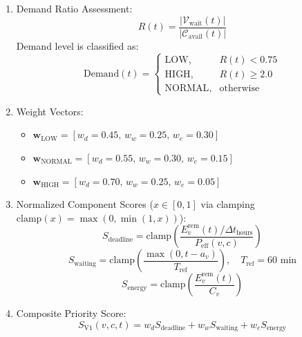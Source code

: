 \documentclass[conference]{IEEEtran}
\begin{document}
\begin{enumerate}
    \item Demand Ratio Assessment:
    \begin{equation}
    R(t) = \frac{|\mathcal{V}_{\mathrm{wait}}(t)|}{|\mathcal{C}_{\mathrm{avail}}(t)|}
    \end{equation}
    Demand level is classified as:
    \begin{equation}
    \mathrm{Demand}(t) = \begin{cases}
    \text{LOW}, & R(t) < 0.75 \\
    \text{HIGH}, & R(t) \ge 2.0 \\
    \text{NORMAL}, & \text{otherwise}
    \end{cases}
    \end{equation}
    \item Weight Vectors:
    \begin{itemize}
        \item $\mathbf{w}_{\mathrm{LOW}} = [w_d=0.45, \, w_w=0.25, \, w_e=0.30]$
        \item $\mathbf{w}_{\mathrm{NORMAL}} = [w_d=0.55, \, w_w=0.30, \, w_e=0.15]$
        \item $\mathbf{w}_{\mathrm{HIGH}} = [w_d=0.70, \, w_w=0.25, \, w_e=0.05]$
    \end{itemize}
    \item Normalized Component Scores ($x \in [0, 1]$ via clamping $\mathrm{clamp}(x) = \max(0, \min(1, x))$):
    \begin{equation}
    S_{\mathrm{deadline}} = \mathrm{clamp}\left( \frac{E_v^{\mathrm{rem}}(t) / \Delta t_{\mathrm{hours}}}{P_{\mathrm{eff}}(v, c)} \right)
    \end{equation}
    \begin{equation}
    S_{\mathrm{waiting}} = \mathrm{clamp}\left( \frac{\max(0, t - a_v)}{T_{\mathrm{ref}}} \right), \quad T_{\mathrm{ref}} = 60\text{ min}
    \end{equation}
    \begin{equation}
    S_{\mathrm{energy}} = \mathrm{clamp}\left( \frac{E_v^{\mathrm{rem}}(t)}{C_v} \right)
    \end{equation}
    \item Composite Priority Score:
    \begin{equation}
    S_{\mathrm{V1}}(v, c, t) = w_d S_{\mathrm{deadline}} + w_w S_{\mathrm{waiting}} + w_e S_{\mathrm{energy}}
    \label{eq:v1_score}
    \end{equation}
\end{enumerate}
\end{document}
